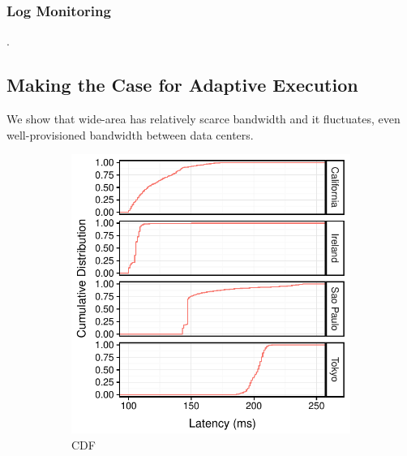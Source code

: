 \subsubsection{Log Monitoring}
\label{sec:log-monitoring}

.

\subsection{Making the Case for Adaptive Execution}
\label{sec:making-case-adapt}

We show that wide-area has relatively scarce bandwidth and it fluctuates, even
well-provisioned bandwidth between data centers.

\begin{figure}
  \centering
  \begin{subfigure}{.48\columnwidth}
    \centering
    \includegraphics[width=.95\linewidth]{figures/latency-cdf.pdf}
    \caption{CDF}
    \label{fig:bar}
  \end{subfigure}
  \begin{subfigure}{.48\columnwidth}
    \centering

\end{subfigure}
\end{figure}
